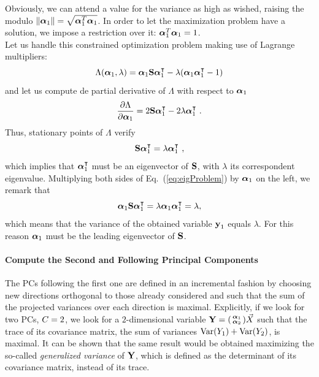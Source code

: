 Obviously, we can attend a value for the variance as high as wished, raising the modulo $\|\boldsymbol{\alpha}_1\| = \sqrt{\boldsymbol{\alpha}_1^T\boldsymbol{\alpha}_1}$. In order to let the maximization problem have a solution, we impose a restriction over it: $\boldsymbol{\alpha}_1^T\boldsymbol{\alpha}_1 = 1$.\\
Let us handle this constrained optimization problem making use of Lagrange multipliers:
\begin{equation}
\Lambda(\boldsymbol{\alpha}_1, \lambda) = \boldsymbol{\alpha}_1\textbf{S}\boldsymbol{\alpha}_1^\intercal - \lambda(\boldsymbol{\alpha}_1\boldsymbol{\alpha}_1^\intercal-1)
\end{equation}
and let us compute de partial derivative of $\Lambda$ with respect to $\boldsymbol{\alpha}_1$
\begin{equation}
\frac{\partial\Lambda}{\partial\boldsymbol{\alpha}_1} = 2\textbf{S}\boldsymbol{\alpha}_1^\intercal-2\lambda\boldsymbol{\alpha}_1^\intercal \mbox{ .}
\end{equation}
Thus, stationary points of $\Lambda$ verify
\begin{equation}\label{eq:eigProblem}
\textbf{S}\boldsymbol{\alpha}_1^\intercal = \lambda\boldsymbol{\alpha}_1^\intercal \mbox{ ,}
\end{equation}
which implies that $\boldsymbol{\alpha}_1^\intercal$ must be an eigenvector of $\textbf{S}$, with $\lambda$ its correspondent eigenvalue. Multiplying both sides of Eq.~(\ref{eq:eigProblem}) by $\boldsymbol{\alpha}_1$ on the left, we remark that
\begin{equation}
\boldsymbol{\alpha}_1\textbf{S}\boldsymbol{\alpha}_1^\intercal = \lambda\boldsymbol{\alpha}_1\boldsymbol{\alpha}_1^\intercal = \lambda, 
\end{equation}
which means that the variance of the obtained variable $\textbf{y}_1$ equals $\lambda$. For this reason $\boldsymbol{\alpha}_1$ must be the leading eigenvector of $\textbf{S}$.

\paragraph{Compute the Second and Following Principal Components}
The PCs following the first one are defined in an incremental fashion by choosing new directions orthogonal to those already considered and such that the sum of the projected variances over each direction is maximal. Explicitly, if we look for two PCs, \ie $C = 2$,  we look for a $2$-dimensional variable $\textbf{Y} = \begin{psmallmatrix} \boldsymbol{\alpha}_1 \\ \boldsymbol{\alpha}_2 \end{psmallmatrix} \vec{X}$ such that the trace of its covariance matrix, \ie the sum of variances $\mathrm{Var}(Y_1)+\mathrm{Var}(Y_2)$, is maximal. It can be shown that the same result would be obtained maximizing the so-called \emph{generalized variance} of $\textbf{Y}$, which is defined as the determinant of its covariance matrix, instead of its trace. \\


